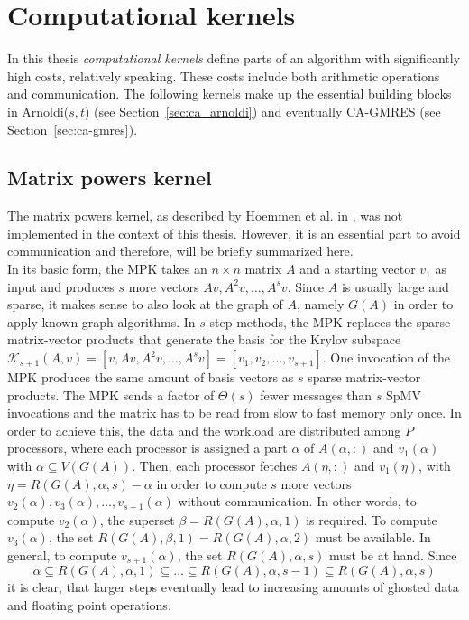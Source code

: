\documentclass{scrartcl}
\numberwithin{equation}{section}
\begin{document}
\section{Computational kernels}
In this thesis \textit{computational kernels} define parts of an algorithm with significantly high costs, relatively speaking. These costs include both arithmetic operations and communication. The following kernels make up the essential building blocks in Arnoldi($s,t$) (see Section~\ref{sec:ca_arnoldi}) and eventually CA-GMRES (see Section~\ref{sec:ca-gmres}).


\subsection{Matrix powers kernel}
The matrix powers kernel, as described by Hoemmen et al. in \cite{Hoemmen:2010:CKS:1970638}, was not implemented in the context of this thesis. However, it is an essential part to avoid communication and therefore, will be briefly summarized here.\\
In its basic form, the MPK takes an $n \times n$ matrix $A$ and a starting vector $v_1$ as input and produces $s$ more vectors $Av, A^2v, \ldots, A^sv$. Since $A$ is usually large and sparse, it makes sense to also look at the graph of $A$, namely $G(A)$ in order to apply known graph algorithms. In $s$-step methods, the MPK replaces the sparse matrix-vector products that generate the basis for the Krylov subspace $\mathcal{K}_{s + 1}(A, v) = \left[v, Av, A^2v, \ldots, A^{s}v\right] = \left[v_1, v_2, \ldots, v_{s + 1}\right]$. One invocation of the MPK produces the same amount of basis vectors as $s$ sparse matrix-vector products. The MPK sends a factor of $\Theta(s)$ fewer messages than $s$ SpMV invocations and the matrix has to be read from slow to fast memory only once.
In order to achieve this, the data and the workload are distributed among $P$ processors, where each processor is assigned a part $\alpha$ of $A(\alpha,:)$ and $v_1(\alpha)$ with $\alpha \subseteq V(G(A))$. Then, each processor fetches $A(\eta,:)$ and $v_1(\eta)$, with $\eta = R(G(A), \alpha, s) - \alpha$ in order to compute $s$ more vectors $v_2(\alpha), v_3(\alpha), \ldots, v_{s + 1}(\alpha)$ without communication. In other words, to compute $v_2(\alpha)$, the superset $\beta = R(G(A),\alpha, 1)$ is required. To compute $v_3(\alpha)$, the set $R(G(A),\beta, 1) = R(G(A),\alpha, 2)$ must be available. In general, to compute $v_{s + 1}(\alpha)$, the set $R(G(A),\alpha, s)$ must be at hand. Since
\begin{equation*}
\alpha \subseteq R(G(A),\alpha, 1) \subseteq \ldots \subseteq R(G(A),\alpha, s - 1) \subseteq R(G(A),\alpha, s)
\end{equation*} it is clear, that larger steps eventually lead to increasing amounts of ghosted data and floating point operations.
\end{document}
